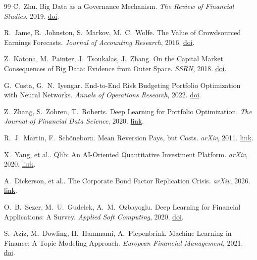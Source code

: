 \begin{thebibliography}{99}
 C.~Zhu. Big Data as a Governance Mechanism. \emph{The Review of Financial Studies}, 2019. \href{https://doi.org/10.1093/rfs/hhy081}{doi}.

 R.~Jame, R.~Johnston, S.~Markov, M.~C.~Wolfe. The Value of Crowdsourced Earnings Forecasts. \emph{Journal of Accounting Research}, 2016. \href{https://doi.org/10.1111/1475-679x.12121}{doi}.

 Z.~Katona, M.~Painter, J.~Tsoukalas, J.~Zhang. On the Capital Market Consequences of Big Data: Evidence from Outer Space. \emph{SSRN}, 2018. \href{https://doi.org/10.2139/ssrn.3222741}{doi}.

 G.~Costa, G.~N.~Iyengar. End-to-End Risk Budgeting Portfolio Optimization with Neural Networks. \emph{Annals of Operations Research}, 2022. \href{https://doi.org/10.1007/s10479-023-05539-4}{doi}.

 Z.~Zhang, S.~Zohren, T.~Roberts. Deep Learning for Portfolio Optimization. \emph{The Journal of Financial Data Science}, 2020. \href{https://arxiv.org/abs/2005.13665}{link}.

 R.~J.~Martin, F.~Sch\"oneborn. Mean Reversion Pays, but Costs. \emph{arXiv}, 2011. \href{https://arxiv.org/abs/1103.4934}{link}.

 X.~Yang, et al.. Qlib: An AI-Oriented Quantitative Investment Platform. \emph{arXiv}, 2020. \href{https://arxiv.org/abs/2009.11189}{link}.

 A.~Dickerson, et al.. The Corporate Bond Factor Replication Crisis. \emph{arXiv}, 2026. \href{https://arxiv.org/abs/2604.07880}{link}.

 O.~B.~Sezer, M.~U.~Gudelek, A.~M.~Ozbayoglu. Deep Learning for Financial Applications: A Survey. \emph{Applied Soft Computing}, 2020. \href{https://doi.org/10.1016/j.asoc.2020.106384}{doi}.

 S.~Aziz, M.~Dowling, H.~Hammami, A.~Piepenbrink. Machine Learning in Finance: A Topic Modeling Approach. \emph{European Financial Management}, 2021. \href{https://doi.org/10.1111/eufm.12326}{doi}.

\end{thebibliography}
